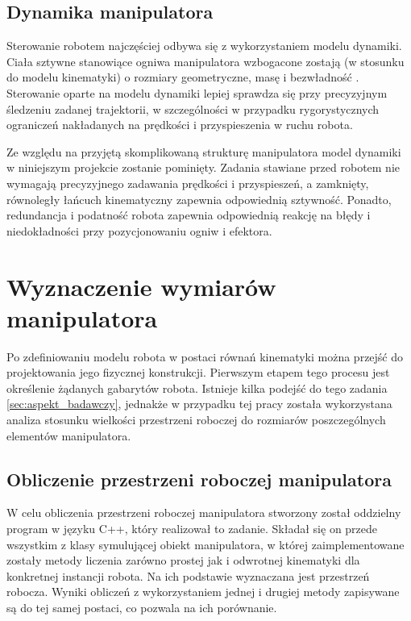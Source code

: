 \documentclass[printmode]{mgr}
\begin{document}
\section{Dynamika manipulatora}
Sterowanie robotem najczęściej odbywa się z wykorzystaniem modelu dynamiki. Ciała sztywne stanowiące ogniwa
manipulatora wzbogacone zostają (w stosunku do modelu kinematyki) o rozmiary geometryczne, masę i bezwładność \cite{podstawy_robotyki}.
Sterowanie oparte na modelu dynamiki lepiej sprawdza się przy precyzyjnym śledzeniu zadanej trajektorii, w szczególności
w przypadku rygorystycznych ograniczeń nakładanych na prędkości i przyspieszenia w ruchu robota. 

Ze względu na przyjętą skomplikowaną strukturę manipulatora model dynamiki w niniejszym projekcie zostanie pominięty. Zadania stawiane
przed robotem nie wymagają precyzyjnego zadawania prędkości i przyspieszeń, a zamknięty, równoległy łańcuch kinematyczny
zapewnia odpowiednią sztywność. Ponadto, redundancja i podatność robota zapewnia odpowiednią reakcję na błędy i niedokładności
przy pozycjonowaniu ogniw i efektora.


\chapter{Wyznaczenie wymiarów manipulatora}\label{sec:wyznaczenie_wymiarow_manipulatora}
Po zdefiniowaniu modelu robota w postaci równań kinematyki można przejść do projektowania
jego fizycznej konstrukcji. Pierwszym etapem tego procesu jest określenie żądanych gabarytów
robota. Istnieje kilka podejść do tego zadania \ref{sec:aspekt_badawczy}, jednakże w przypadku tej pracy została
wykorzystana analiza stosunku wielkości przestrzeni roboczej do rozmiarów poszczególnych
elementów manipulatora.

\section{Obliczenie przestrzeni roboczej manipulatora}
W celu obliczenia przestrzeni roboczej manipulatora stworzony został oddzielny program w języku C++, 
który realizował to zadanie. Składał się on przede wszystkim z klasy symulującej obiekt manipulatora, 
w której zaimplementowane zostały metody liczenia zarówno prostej jak i odwrotnej kinematyki dla
konkretnej instancji robota. Na ich podstawie wyznaczana jest przestrzeń robocza. Wyniki obliczeń
z wykorzystaniem jednej i drugiej metody zapisywane są do tej samej postaci, co pozwala na ich porównanie.
\end{document}
